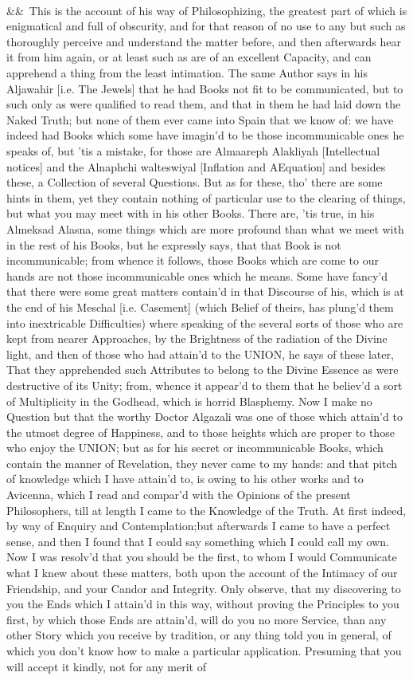 \documentclass[12pt]{article}
\newcommand{\para}[1][]{\par\noindent\ifx&#1&\else\textsuperscript{\footnotesize #1}~\fi}
\begin{document}
\para This is the account of his way of Philosophizing, the greatest part of which is enigmatical and full of obscurity, and for that reason of no use to any but such as thoroughly perceive and understand the matter before, and then afterwards hear it from him again, or at least such as are of an excellent Capacity, and can apprehend a thing from the least intimation. The same Author says in his Aljawahir [i.e. The Jewels] that he had Books not fit to be communicated, but to such only as were qualified to read them, and that in them he had laid down the Naked Truth; but none of them ever came into Spain that we know of: we have indeed had Books which some have imagin'd to be those incommunicable ones he speaks of, but 'tis a mistake, for those are Almaareph Alakliyah [Intellectual notices] and the Alnaphchi walteswiyal [Inflation and AEquation] and besides these, a Collection of several Questions. But as for these, tho' there are some hints in them, yet they contain nothing of particular use to the clearing of things, but what you may meet with in his other Books. There are, 'tis true, in his Almeksad Alasna, some things which are more profound than what we meet with in the rest of his Books, but he expressly says, that that Book is not incommunicable; from whence it follows, those Books which are come to our hands are not those incommunicable ones which he means. Some have fancy'd that there were some great matters contain'd in that Discourse of his, which is at the end of his Meschal [i.e. Casement] (which Belief of theirs, has plung'd them into inextricable Difficulties) where speaking of the several sorts of those who are kept from nearer Approaches, by the Brightness of the radiation of the Divine light, and then of those who had attain'd to the UNION, he says of these later, That they apprehended such Attributes to belong to the Divine Essence as were destructive of its Unity; from, whence it appear'd to them that he believ'd a sort of Multiplicity in the Godhead, which is horrid Blasphemy. Now I make no Question but that the worthy Doctor Algazali was one of those which attain'd to the utmost degree of Happiness, and to those heights which are proper to those who enjoy the UNION; but as for his secret or incommunicable Books, which contain the manner of Revelation, they never came to my hands: and that pitch of knowledge which I have attain'd to, is owing to his other works and to Avicenna, which I read and compar'd with the Opinions of the present Philosophers, till at length I came to the Knowledge of the Truth. At first indeed, by way of Enquiry and Contemplation;but afterwards I came to have a perfect sense, and then I found that I could say something which I could call my own. Now I was resolv'd that you should be the first, to whom I would Communicate what I knew about these matters, both upon the account of the Intimacy of our Friendship, and your Candor and Integrity. Only observe, that my discovering to you the Ends which I attain'd in this way, without proving the Principles to you first, by which those Ends are attain'd, will do you no more Service, than any other Story which you receive by tradition, or any thing told you in general, of which you don't know how to make a particular application. Presuming that you will accept it kindly, not for any merit of 
\end{document}
